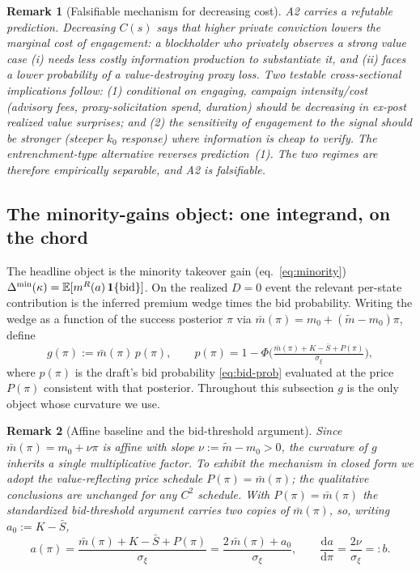 \documentclass[11pt]{article}
\newcommand{\E}{\mathbb{E}}
\newcommand{\1}{\mathbf{1}}
\newtheorem{remark}{Remark}
\begin{document}
\begin{remark}[Falsifiable mechanism for decreasing cost]\label{rem:d5-mech}
A2 carries a refutable prediction. Decreasing $C(s)$ says that higher private conviction lowers the marginal cost of engagement: a blockholder who privately observes a strong value case (i) needs less costly information production to substantiate it, and (ii) faces a lower probability of a value-destroying proxy loss. Two testable cross-sectional implications follow: (1) conditional on engaging, campaign intensity/cost (advisory fees, proxy-solicitation spend, duration) should be \emph{decreasing} in ex-post realized value surprises; and (2) the sensitivity of engagement to the signal should be \emph{stronger} (steeper $k_0$ response) where information is cheap to verify. The entrenchment-type alternative reverses prediction~(1). The two regimes are therefore empirically separable, and A2 is falsifiable.
\end{remark}

\subsection{The minority-gains object: one integrand, on the chord}
\label{app:d5-integrand}

The headline object is the minority takeover gain (eq.~\eqref{eq:minority}) $\Delta^{\min}(\kappa)=\E[m^{R}(a)\,\1\{\textup{bid}\}]$. On the realized $D=0$ event the relevant per-state contribution is the inferred premium wedge times the bid probability. Writing the wedge as a function of the success posterior $\pi$ via $\bar m(\pi)=m_0+(\tilde m-m_0)\pi$, define
\begin{equation}\label{eq:d5-gdef}
  g(\pi):=\bar m(\pi)\,p(\pi),\qquad
  p(\pi)=1-\Phi\!\Big(\tfrac{\bar m(\pi)+K-\bar S+P(\pi)}{\sigma_\xi}\Big),
\end{equation}
where $p(\pi)$ is the draft's bid probability \eqref{eq:bid-prob} evaluated at the price $P(\pi)$ consistent with that posterior. Throughout this subsection $g$ is the only object whose curvature we use.

\begin{remark}[Affine baseline and the bid-threshold argument]\label{rem:d5-affine}
Since $\bar m(\pi)=m_0+\nu\pi$ is affine with slope $\nu:=\tilde m-m_0>0$, the curvature of $g$ inherits a single multiplicative factor. To exhibit the mechanism in closed form we adopt the \emph{value-reflecting} price schedule $P(\pi)=\bar m(\pi)$; the qualitative conclusions are unchanged for any $C^2$ schedule. With $P(\pi)=\bar m(\pi)$ the standardized bid-threshold argument carries \emph{two} copies of $\bar m(\pi)$, so, writing $a_0:=K-\bar S$,
\begin{equation}\label{eq:d5-adef}
  a(\pi)=\frac{\bar m(\pi)+K-\bar S+P(\pi)}{\sigma_\xi}=\frac{2\,\bar m(\pi)+a_0}{\sigma_\xi},
  \qquad \frac{\mathrm d a}{\mathrm d\pi}=\frac{2\nu}{\sigma_\xi}=:b.
\end{equation}
\end{remark}
\end{document}
